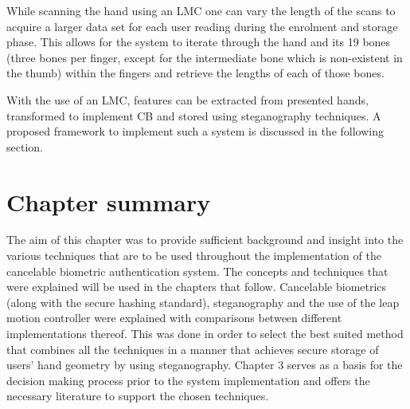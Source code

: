 While scanning the hand using an LMC one can vary the length of the scans to acquire a larger data set for each user reading during the enrolment and storage phase. This allows for the system to iterate through the hand and its 19 bones (three bones per finger, except for the intermediate bone which is non-existent in the thumb) within the fingers and retrieve the lengths of each of those bones.

With the use of an LMC, features can be extracted from presented hands, transformed to implement CB and stored using steganography techniques. A proposed framework to implement such a system is discussed in the following section.


\section[Chapter summary]{Chapter summary}

The aim of this chapter was to provide sufficient background and insight into the various techniques that are to be used throughout the implementation of the cancelable biometric authentication system. The concepts and techniques that were explained will be used in the chapters that follow. Cancelable biometrics (along with the secure hashing standard), steganography and the use of the leap motion controller were explained with comparisons between different implementations thereof. This was done in order to select the best suited method that combines all the techniques in a manner that achieves secure storage of users’ hand geometry by using steganography.
Chapter 3 serves as a basis for the decision making process prior to the system implementation and offers the necessary literature to support the chosen techniques.


